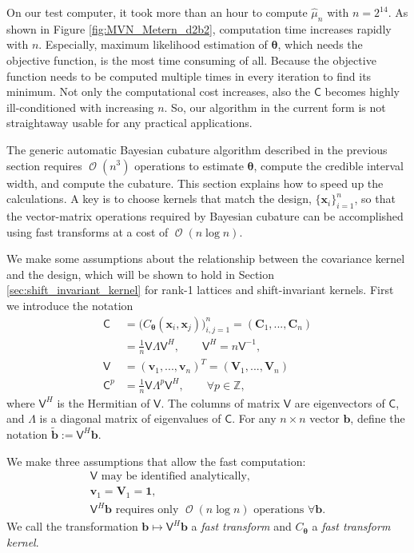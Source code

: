 \documentclass{iitthesis}          %
\DeclareMathOperator{\Order}{{\mathcal O}}
\newcommand{\bm}[1]{\boldsymbol{#1}}
\newcommand{\integers}{\mathbb{Z}}
\newcommand{\vtheta}{{\bm{\theta}}}
\newcommand{\vb}{\bm{b}}
\newcommand{\vC}{\bm{C}}
\newcommand{\vv}{\bm{v}}
\newcommand{\vV}{\bm{V}}
\newcommand{\vx}{\bm{x}}
\newcommand{\vone}{\bm{1}}
\newcommand{\mC}{\mathsf{C}}
\newcommand{\mLambda}{\mathsf{\Lambda}}
\newcommand{\mV}{\mathsf{V}}
\newcommand{\hmu}{\widehat{\mu}}
\begin{document}
On our test computer, it took more than an hour to compute $\hmu_n$ with $n=2^{14}$. As shown in Figure \ref{fig:MVN_Metern_d2b2}, computation time increases rapidly with $n$. 
Especially, maximum likelihood estimation of $\vtheta$, which needs the objective function, is the most time consuming of all. 
Because the objective function needs to be computed multiple times in every iteration to find its minimum. 
Not only the computational cost increases, also the $\mC$ becomes highly ill-conditioned with increasing $n$.
So, our algorithm in the current form is not straightaway usable for any practical applications.


\label{sec:fast_BC}

The generic automatic Bayesian cubature algorithm described in the previous section requires $\Order(n^3)$ operations to estimate $\vtheta$, compute the credible interval width, and compute the cubature.  This section explains how to speed up the calculations. A key is to choose kernels that match the design, $\{\vx_i\}_{i=1}^n$, so that the vector-matrix operations required by Bayesian cubature can be accomplished using fast transforms at a cost of $\Order(n \log n)$.


We make some assumptions about the relationship between the covariance kernel and the design, which will be shown to hold in Section \ref{sec:shift_invariant_kernel} for rank-1 lattices and shift-invariant kernels.  First we introduce the notation
\begin{align}
\nonumber
\mC &= \Big(C_\vtheta(\vx_i,\vx_j)\Big)_{i,j=1}^n  = (\vC_1,...,\vC_n) 
\\
\label{eqn:ftk_factor}
&= \frac 1n \mV \mLambda \mV^H , 
\quad \quad \mV^H = n \mV^{-1}, \\
\nonumber
\mV &= (\vv_1,...,\vv_n)^T = (\vV_1,...,\vV_n) \\
\nonumber
\mC^p  &= \frac 1n \mV \mLambda^{p} \mV^H, \qquad \forall p \in \integers,
\end{align}
where $\mV^H$ is the Hermitian of $\mV$.  The columns of matrix $\mV$ are eigenvectors of $\mC$, and $\mLambda$ is a diagonal matrix of eigenvalues of $\mC$.
For any $n \times n$ vector $\vb$, define the notation  $\widetilde{\vb} := \mV^H \vb$.

We make three assumptions that allow the fast computation:
\begin{subequations} \label{fastcompAssump}
	\begin{gather}
	\label{fastcompAssumpA}
	\mV \text{ may be identified analytically}, \\
	\label{fastcompAssumpB}
	\vv_1 = \vV_1 = \vone, \\
	\label{fastcompAssumpC}
	\mV^H \vb  \text{ requires only $\Order(n \log n)$ operations } \forall \vb.
	\end{gather}
\end{subequations}
We call the transformation $\vb \mapsto \mV^H \vb$ a \emph{fast transform} and $C_\vtheta$ a \emph{fast transform kernel}.  
\end{document}
